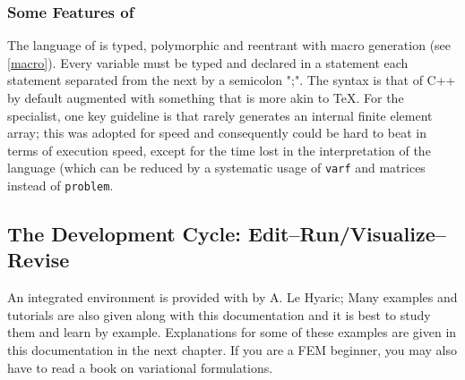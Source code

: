 \documentclass[a4paper,twoside,12pt]{book}
\begin{document}
\subsubsection{Some Features of \freefempp}

The language of \freefempp is  typed, polymorphic and reentrant with macro generation (see
\ref{macro}).  Every variable must be typed and declared in a
statement each statement separated from the next by a semicolon ";".
The syntax is that of C++ by default augmented with something that is more akin
to \TeX.
For the specialist, one key guideline is that \freefempp rarely generates an internal
finite element  array;
this was adopted for speed and
consequently \freefempp could be hard to beat in terms of execution speed, except
for the time lost in the interpretation of the language (which can be reduced by a systematic usage
of \texttt{varf} and matrices instead of \texttt{problem}.



\subsection{The Development Cycle: Edit--Run/Visualize--Revise}

An integrated environment is provided with \freefempp by A. Le Hyaric;
Many examples and tutorials are also given along with this documentation and it is best
to study them and learn by example.
Explanations for some of these examples are given in this documentation in the next chapter. If you are a
FEM beginner, you may also have to read a book on variational formulations.
\end{document}

